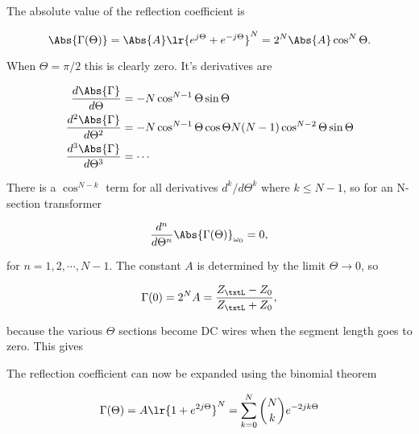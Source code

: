 The absolute value of the reflection coefficient is

\begin{dmath}\label{eqn:uwavesDeck7MultisectionTransformersCore:160}
\Abs{\Gamma(\Theta)}
=
\Abs{A} \lr{ e^{j \Theta} + e^{- j \Theta} }^N
=
2^N \Abs{A} \cos^N\Theta.
\end{dmath}

When \( \Theta = \pi/2 \) this is clearly zero.  It's derivatives are

\begin{equation}\label{eqn:uwavesDeck7MultisectionTransformersCore:180}
\begin{aligned}
\frac{d \Abs{\Gamma}}{d\Theta} &= -N \cos^{N-1} \Theta \sin\Theta \\
\frac{d^2 \Abs{\Gamma}}{d\Theta^2} &= -N \cos^{N-1} \Theta \cos\Theta N(N-1) \cos^{N-2} \Theta \sin\Theta  \\
\frac{d^3 \Abs{\Gamma}}{d\Theta^3} &= \cdots
\end{aligned}
\end{equation}

There is a \( \cos^{N-k} \) term for all derivatives \( d^k/d\Theta^k \) where \( k \le N-1 \), so for an N-section transformer

\begin{equation}\label{eqn:uwavesDeck7MultisectionTransformersCore:140}
\frac{d^n}{d\Theta^n} \Abs{\Gamma(\Theta)}_{\omega_0} = 0,
\end{equation}

for \( n = 1, 2, \cdots, N-1 \).  The constant \( A \) is determined by the limit \( \Theta \rightarrow 0 \), so

\begin{equation}\label{eqn:uwavesDeck7MultisectionTransformersCore:200}
\Gamma(0) = 2^N A = \frac{Z_\txtL - Z_0}{Z_\txtL + Z_0},
\end{equation}

because the various \( \Theta \) sections become DC wires when the segment length goes to zero.  This gives


The reflection coefficient can now be expanded using the binomial theorem

\begin{dmath}\label{eqn:uwavesDeck7MultisectionTransformersCore:240}
\Gamma(\Theta)
= A \lr{ 1 + e^{ 2 j \Theta } }^N
= \sum_{k = 0}^N \binom{N}{k} e^{ -2 j k \Theta}
\end{dmath}

